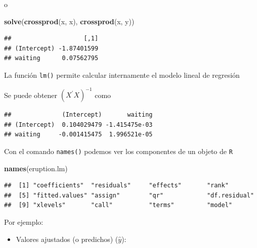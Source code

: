 \documentclass[]{article}
\def\tightlist{}
\newenvironment{Shaded}{\begin{snugshade}}{\end{snugshade}}
\newcommand{\KeywordTok}[1]{\textcolor[rgb]{0.13,0.29,0.53}{\textbf{{#1}}}}
\newcommand{\NormalTok}[1]{{#1}}
\numberwithin{equation}{section}
\begin{document}
o

\begin{Shaded}
\begin{Highlighting}[]
\KeywordTok{solve}\NormalTok{(}\KeywordTok{crossprod}\NormalTok{(x, x), }\KeywordTok{crossprod}\NormalTok{(x, y))}
\end{Highlighting}
\end{Shaded}

\begin{verbatim}
##                    [,1]
## (Intercept) -1.87401599
## waiting      0.07562795
\end{verbatim}

La función \texttt{lm()} permite calcular internamente el modelo lineal
de regresión

Se puede obtener \((X^\prime X)^{-1}\) como

\begin{Shaded}
\end{Shaded}

\begin{verbatim}
##              (Intercept)       waiting
## (Intercept)  0.104029479 -1.415475e-03
## waiting     -0.001415475  1.996521e-05
\end{verbatim}

Con el comando \texttt{names()} podemos ver los componentes de un objeto
de \texttt{R}

\begin{Shaded}
\begin{Highlighting}[]
\KeywordTok{names}\NormalTok{(eruption.lm)}
\end{Highlighting}
\end{Shaded}

\begin{verbatim}
##  [1] "coefficients"  "residuals"     "effects"       "rank"         
##  [5] "fitted.values" "assign"        "qr"            "df.residual"  
##  [9] "xlevels"       "call"          "terms"         "model"
\end{verbatim}

Por ejemplo:

\begin{itemize}
\tightlist
\item
  Valores ajustados (o predichos) (\(\hat{y}\)):
\end{itemize}

\begin{Shaded}
\end{Shaded}
\end{document}
